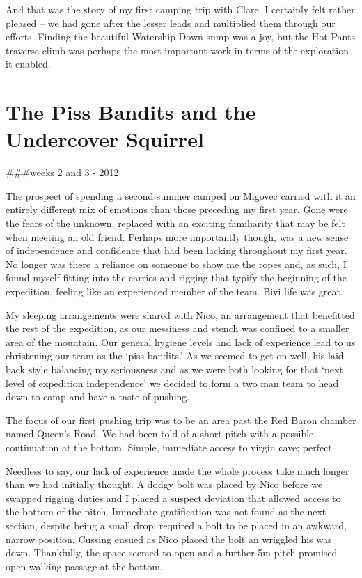 And that was the story of my first camping trip with Clare. I certainly
felt rather pleased -- we had gone after the lesser leads and multiplied
them through our efforts. Finding the beautiful Watership Down sump was
a joy, but the Hot Pants traverse climb was perhaps the most important
work in terms of the exploration it enabled.


\hypertarget{the-piss-bandits-and-the-undercover-squirrel}{%
\section{The Piss Bandits and the Undercover
Squirrel}\label{the-piss-bandits-and-the-undercover-squirrel}}

\#\#\#weeks 2 and 3 - 2012

The prospect of spending a second summer camped on Migovec carried with
it an entirely different mix of emotions than those preceding my first
year. Gone were the fears of the unknown, replaced with an exciting
familiarity that may be felt when meeting an old friend. Perhaps more
importantly though, was a new sense of independence and confidence that
had been lacking throughout my first year. No longer was there a
reliance on someone to show me the ropes and, as such, I found myself
fitting into the carries and rigging that typify the beginning of the
expedition, feeling like an experienced member of the team. Bivi life
was great.

My sleeping arrangements were shared with Nico, an arrangement that
benefitted the rest of the expedition, as our messiness and stench was
confined to a smaller area of the mountain. Our general hygiene levels
and lack of experience lead to us christening our team as the `piss
bandits.' As we seemed to get on well, his laid-back style balancing my
seriousness and as we were both looking for that `next level of
expedition independence' we decided to form a two man team to head down
to camp and have a taste of pushing.

The focus of our first pushing trip was to be an area past the Red Baron
chamber named Queen's Road. We had been told of a short pitch with a
possible continuation at the bottom. Simple, immediate access to virgin
cave; perfect.

Needless to say, our lack of experience made the whole process take much
longer than we had initially thought. A dodgy bolt was placed by Nico
before we swapped rigging duties and I placed a suspect deviation that
allowed access to the bottom of the pitch. Immediate gratification was
not found as the next section, despite being a small drop, required a
bolt to be placed in an awkward, narrow position. Cussing ensued as Nico
placed the bolt an wriggled his was down. Thankfully, the space seemed
to open and a further 5m pitch promised open walking passage at the
bottom.


